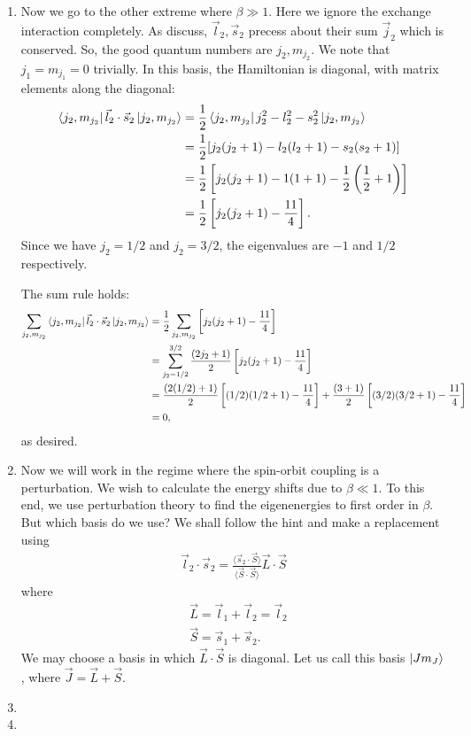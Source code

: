 \documentclass{article}
\theoremstyle{definition}
\newcommand{\be}{\beta}
\newcommand{\f}[2]{\frac{#1}{#2}}
\newcommand{\lp}{\left(}
\newcommand{\rp}{\right)}
\newcommand{\lb}{\left[}
\newcommand{\rb}{\right]}
\begin{document}
\begin{enumerate}[label=(\alph*)]
	\item Now we go to the other extreme where $\be\gg 1$. Here we ignore the exchange interaction completely. As discuss, $\vec{l}_2, \vec{s}_2$ precess about their sum $\vec{j}_2$ which is conserved. So, the good quantum numbers are $j_2, m_{j_2}$. We note that $j_1 = m_{j_1} = 0$ trivially. In this basis, the Hamiltonian is diagonal,
	with matrix elements along the diagonal:
	\begin{align*}
	\bra{j_2,m_{j_2}} \vec{l}_2 \cdot \vec{s}_2 \ket{j_2,m_{j_2}} 
	&= \f{1}{2}\bra{j_2,m_{j_2}} j_2^2 - l_2^2 - s_2^2 \ket{j_2,m_{j_2}} \\
	&= \f{1}{2} [j_2(j_2+1) - l_2(l_2+1) - s_2(s_2+1)] \\
	&= \f{1}{2}\lb j_2(j_2+1) - 1(1+1) - \f{1}{2}\lp \f{1}{2}+1\rp  \rb \\
	&= \f{1}{2}\lb j_2(j_2+1) - \f{11}{4} \rb.
	\end{align*}
	Since we have $j_2 = 1/2$ and $j_2 = 3/2$, the eigenvalues are $-1$ and $1/2$ respectively. 
	
	
	
	The sum rule holds:
	\begin{align*}
	\sum_{j_2,m_{j_2}} \bra{j_2,m_{j_2}} \vec{l}_2 \cdot \vec{s}_2 \ket{j_2,m_{j_2}} 
	&= \f{1}{2}\sum_{j_2,m_{j_2}} \lb j_2(j_2+1) - \f{11}{4} \rb \\
	&= \sum_{j_2 = 1/2}^{3/2} \f{(2j_2+1)}{2}  \lb j_2(j_2+1) - \f{11}{4} \rb \\
	&= \f{(2(1/2)+1)}{2}  \lb (1/2)(1/2+1) - \f{11}{4} \rb + \f{(3+1)}{2}  \lb (3/2)(3/2+1) - \f{11}{4} \rb\\
	&= 0,
	\end{align*}
	as desired. 
	
	
	\item Now we will work in the regime where the spin-orbit coupling is a perturbation.  We wish to calculate the energy shifts due to $\be \ll 1$. To this end, we use perturbation theory to find the eigenenergies to first order in $\be$. But which basis do we use? We shall follow the hint and make a replacement using 
	\begin{align*}
	\vec{l}_2 \cdot \vec{s}_2 = \f{\langle \vec{s}_2 \cdot \vec{S}\rangle}{\langle \vec{S}\cdot \vec{S}\rangle} \vec{L} \cdot \vec{S}
	\end{align*}
	where 
	\begin{align*}
	&\vec{L} = \vec{l}_1 + \vec{l}_2 = \vec{l}_2\\
	&\vec{S} = \vec{s}_1 + \vec{s}_2.
	\end{align*}
	We may choose a basis in which $\vec{L}\cdot \vec{S}$ is diagonal. Let us call this basis $\ket{J m_J}$, where $\vec{J} = \vec{L} + \vec{S}$. 
	
	\item 
	
	\item 
\end{enumerate}
\end{document}
